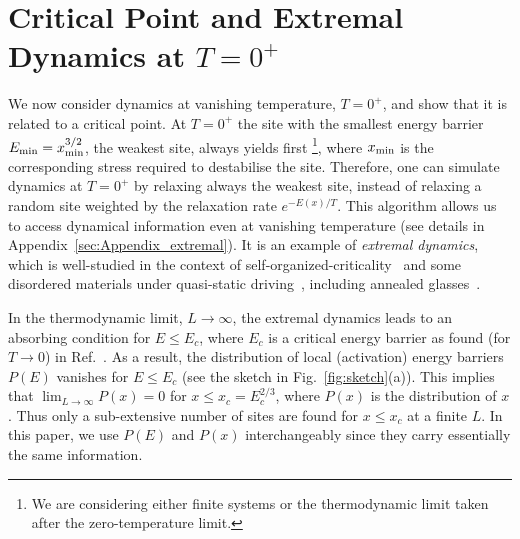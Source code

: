 \documentclass[pre,twocolumn,superscriptaddress,tightenlines,showpacs,longbibliography,floatfix,footinbib]{revtex4-1}
\begin{document}
\section{Critical Point and Extremal Dynamics at $T=0^+$}
\label{sec:zero_T}




We now consider dynamics at vanishing temperature, $T=0^+$, and show that it is related to a critical point. At $T=0^+$ the site with the smallest energy barrier $E_{\rm min}= x_{\rm min}^{3/2}$, the weakest site, always yields first \footnote{We are considering either finite systems or the thermodynamic limit taken after the zero-temperature limit.}, where $x_{\rm min}$ is the corresponding stress required to destabilise the site. Therefore, one can simulate dynamics at $T=0^+$ by relaxing always the weakest site, instead of relaxing a random site weighted by the relaxation rate $e^{-E(x)/T}$. This algorithm allows us to access dynamical information even at vanishing temperature %
(see details in Appendix~\ref{sec:Appendix_extremal}).
It is an example of {\it extremal dynamics}, which is well-studied in the context of self-organized-criticality~\cite{paczuski1996avalanche} and some disordered materials under quasi-static driving~\cite{Baret2002,purrello2017creep}, including annealed glasses~\cite{kumar2022mapping}.

In the thermodynamic limit, $L \to \infty$, the extremal dynamics leads to an absorbing condition for $E \leq E_c$, where $E_c$ is a critical energy barrier as found (for $T\rightarrow 0$) in Ref.~\cite{ozawa2023elasticity}. As a result, the distribution of local (activation) energy barriers $P(E)$ vanishes for $E \leq E_c$ (see the sketch in Fig.~\ref{fig:sketch}(a)). %
This implies that $\lim_{L\rightarrow\infty} P(x)=0$ for $x\leq x_c=E_c^{2/3}$, where $P(x)$ is the distribution of $x$. Thus only a sub-extensive number of sites are found for $x \leq x_c$ at a finite $L$.
In this paper, we use $P(E)$ and $P(x)$ interchangeably since they carry essentially the same information.
\end{document}
